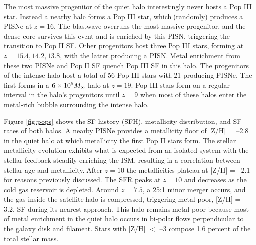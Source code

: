\documentclass[12pt,preprint]{aastex}
\newcommand{\li}{\noindent$\bullet$\quad}
\newcommand{\Ms}{\ifmmode{M_\odot}\else{$M_\odot$}\fi}
\begin{document}
The most massive progenitor of the quiet halo interestingly never
hosts a Pop III star.  Instead a nearby halo forms a Pop III star,
which (randomly) produces a PISNe at $z=16$.  The blastwave overruns
the most massive progenitor, and the dense core survives this event
and is enriched by this PISN, triggering the transition to Pop II SF.
Other progenitors host three Pop III stars, forming at $z = 15.4,
14.2, 13.8$, with the latter producing a PISN.  Metal enrichment from
these two PISNe and Pop II SF quench Pop III SF in this halo.  The
progenitors of the intense halo host a total of 56 Pop III stars with
21 producing PISNe.  The first forms in a $6 \times 10^5 \Ms$ halo at
$z=19$.  Pop III stars form on a regular interval in the halo's
progenitors until $z=9$ when most of these halos enter the metal-rich
bubble surrounding the intense halo.


Figure \ref{fig:pops} shows the SF history (SFH), metallicity
distribution, and SF rates of both halos.  A nearby PISNe provides a
metallicity floor of [Z/H] = --2.8 in the quiet halo at which
metallicity the first Pop II stars form.  The stellar metallicity
evolution exhibits what is expected from an isolated system with the
stellar feedback steadily enriching the ISM, resulting in a
correlation between stellar age and metallicity.  After $z=10$ the
metallicities plateau at [Z/H] = --2.1 for reasons previously
discussed.  The SFR peaks at $z=10$ and decreases as the cold gas
reservoir is depleted.  Around $z=7.5$, a 25:1 minor merger occurs,
and the gas inside the satellite halo is compressed, triggering
metal-poor, [Z/H] = --3.2, SF during its nearest approach.  This halo
remains metal-poor because most of metal enrichment in the quiet halo
occurs in bi-polar flows perpendicular to the galaxy disk and
filament.  Stars with [Z/H] $<$ --3 compose 1.6 percent of the total
stellar mass.
       
\end{document}
